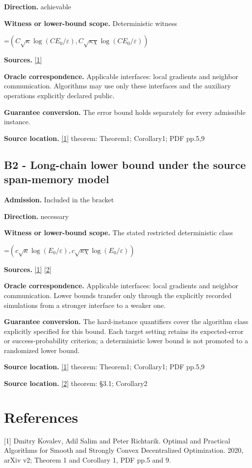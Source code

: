 \documentclass[10pt,a4paper]{article}
\newcommand{\AtlasMath}[1]{\par\begingroup\centering\setbox0=\hbox{$\displaystyle #1$}\ifdim\wd0>1.4\linewidth\typeout{ATLAS WIDE FORMULA: \the\wd0}\fi\ifdim\wd0>\linewidth\resizebox{\linewidth}{!}{\box0}\else\box0\fi\par\endgroup}
\begin{document}
\textbf{Direction.} achievable

\textbf{Witness or lower-bound scope.} Deterministic witness

\AtlasMath{(C\sqrt\kappa\log(CE_0/\varepsilon),C\sqrt{\kappa\chi}\log(CE_0/\varepsilon))}
\textbf{Sources.} \href{https://arxiv.org/pdf/2006.11773v2}{[1]}

\textbf{Oracle correspondence.} Applicable interfaces: local gradients and neighbor communication. Algorithms may use only these interfaces and the auxiliary operations explicitly declared public.

\textbf{Guarantee conversion.} The error bound holds separately for every admissible instance.

\textbf{Source location.} \href{https://arxiv.org/pdf/2006.11773v2}{[1]} theorem: Theorem1; Corollary1; PDF pp.5,9

\subsection{B2 - Long-chain lower bound under the source span-memory model}
\textbf{Admission.} Included in the bracket

\textbf{Direction.} necessary

\textbf{Witness or lower-bound scope.} The stated restricted deterministic class

\AtlasMath{(c\sqrt\kappa\log(E_0/\varepsilon),c\sqrt{\kappa\chi}\log(E_0/\varepsilon))}
\textbf{Sources.} \href{https://arxiv.org/pdf/2006.11773v2}{[1]} \href{https://proceedings.mlr.press/v70/scaman17a/scaman17a.pdf}{[2]}

\textbf{Oracle correspondence.} Applicable interfaces: local gradients and neighbor communication. Lower bounds transfer only through the explicitly recorded simulations from a stronger interface to a weaker one.

\textbf{Guarantee conversion.} The hard-instance quantifiers cover the algorithm class explicitly specified for this bound. Each target setting retains its expected-error or success-probability criterion; a deterministic lower bound is not promoted to a randomized lower bound.

\textbf{Source location.} \href{https://arxiv.org/pdf/2006.11773v2}{[1]} theorem: Theorem1; Corollary1; PDF pp.5,9

\textbf{Source location.} \href{https://proceedings.mlr.press/v70/scaman17a/scaman17a.pdf}{[2]} theorem: §3.1; Corollary2

\section{References}
[1] Dmitry Kovalev, Adil Salim and Peter Richtarik. Optimal and Practical Algorithms for Smooth and Strongly Convex Decentralized Optimization. 2020, arXiv v2; Theorem 1 and Corollary 1, PDF pp.5 and 9.
\end{document}
